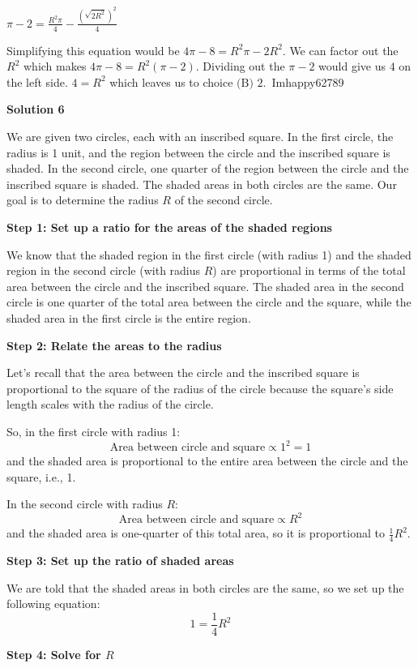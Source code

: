 \begin{enumerate}
 $\pi - 2 = \frac{R^2\pi}{4} - \frac{\left(\sqrt{2R^2}\right)^2}{4}$

 Simplifying this equation would be $4\pi - 8 = R^2\pi - 2R^2$. We can factor out the $R^2$ which makes $4\pi - 8 = R^2\left(\pi - 2\right)$. Dividing out the $\pi - 2$ would give us $4$ on the left side. $4 = R^2$ which leaves us to choice $\boxed{\text{(B) }2}$.~Imhappy62789

 



\textbf{Solution 6}

We are given two circles, each with an inscribed square. In the first circle, the radius is 1 unit, and the region between the circle and the inscribed square is shaded. In the second circle, one quarter of the region between the circle and the inscribed square is shaded. The shaded areas in both circles are the same. Our goal is to determine the radius $R$ of the second circle.

 \textbf{Step 1: Set up a ratio for the areas of the shaded regions}

 We know that the shaded region in the first circle (with radius 1) and the shaded region in the second circle (with radius $R$) are proportional in terms of the total area between the circle and the inscribed square. The shaded area in the second circle is one quarter of the total area between the circle and the square, while the shaded area in the first circle is the entire region.

 \textbf{Step 2: Relate the areas to the radius}

 Let’s recall that the area between the circle and the inscribed square is proportional to the square of the radius of the circle because the square's side length scales with the radius of the circle.

 So, in the first circle with radius 1:
 \[\text{Area between circle and square} \propto 1^2 = 1\]and the shaded area is proportional to the entire area between the circle and the square, i.e., 1.

 In the second circle with radius $R$:
 \[\text{Area between circle and square} \propto R^2\]and the shaded area is one-quarter of this total area, so it is proportional to $\frac{1}{4} R^2$.

 \textbf{Step 3: Set up the ratio of shaded areas}

 We are told that the shaded areas in both circles are the same, so we set up the following equation:
 \[1 = \frac{1}{4} R^2\]

 \textbf{Step 4: Solve for $R$}


\end{enumerate}
